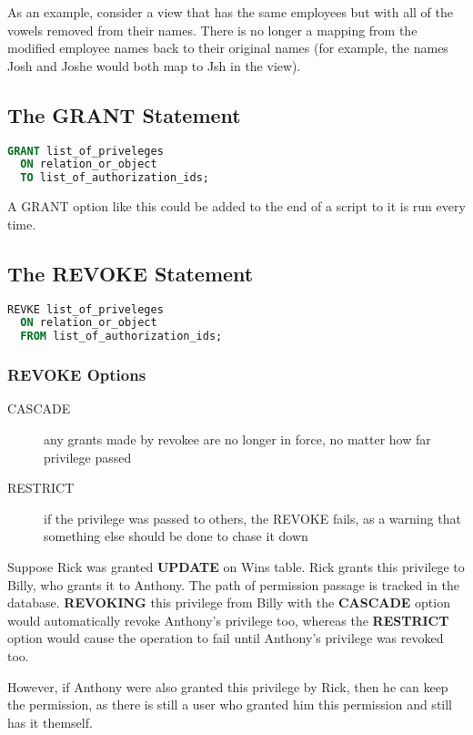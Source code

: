 \documentclass[12pt]{article}
\begin{document}
As an example, consider a view that has the same employees but with all of the
vowels removed from their names. There is no longer a mapping from the modified
employee names back to their original names (for example, the names Josh and
Joshe would both map to Jsh in the view).

\subsection{The GRANT Statement}
\begin{lstlisting}[language=sql,caption=grant format,label={lst:ex3}]
  GRANT list_of_priveleges
  ON relation_or_object
  TO list_of_authorization_ids;
\end{lstlisting}
A GRANT option like this could be added to the end of a script to it is run
every time.

\subsection{The REVOKE Statement}
\begin{lstlisting}[language=sql,caption=revoke format,label={lst:ex4}]
  REVKE list_of_priveleges
  ON relation_or_object
  FROM list_of_authorization_ids;
\end{lstlisting}
\subsubsection{REVOKE Options}
\begin{description}
  \item[CASCADE] any grants made by revokee are no longer in force, no matter
    how far privilege passed
  \item[RESTRICT] if the privilege was passed to others, the REVOKE fails, as a
    warning that something else should be done to chase it down
\end{description}
Suppose Rick was granted \textbf{UPDATE} on Wins table. Rick grants this
privilege to Billy, who grants it to Anthony. The path of permission passage is
tracked in the database. \textbf{REVOKING} this privilege from Billy with the
\textbf{CASCADE} option would automatically revoke Anthony's privilege too,
whereas the \textbf{RESTRICT} option would cause the operation to fail until
Anthony's privilege was revoked too.

However, if Anthony were also granted this privilege by Rick, then he can keep
the permission, as there is still a user who granted him this permission and
still has it themself.
\end{document}
